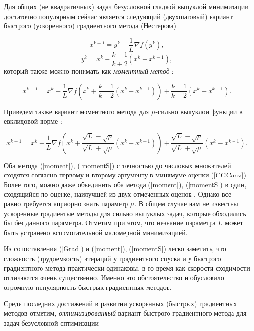   Для общих (не квадратичных) задач безусловной гладкой выпуклой минимизации достаточно популярным сейчас является следующий (двухшаговый) вариант быстрого (ускоренного) градиентного метода (Нестерова) 

  \[
    x^{k+1}=y^k-\frac{1}{L}\nabla f\left( {y^k} \right),
  \]
  \[
    y^k=x^k+\frac{k-1}{k+2}\left( {x^k-x^{k-1}} \right),
  \]
  который также можно понимать как \textit{моментный метод} \cite{su2014differential}:

  \begin{equation}
  \label{moment}
    x^{k+1}=x^k-\frac{1}{L}\nabla f\left( {x^k+\frac{k-1}{k+2}\left( {x^k-x^{k-1}} \right)} \right)+\frac{k-1}{k+2}\left( {x^k-x^{k-1}} \right).
  \end{equation}

  Приведем также вариант моментного метода для $\mu $-сильно выпуклой функции в евклидовой норме \cite{nesterov2013introductory}:

  \begin{equation}
  \label{momentS}
    x^{k+1}=x^k-\frac{1}{L}\nabla f\left( {x^k+\frac{\sqrt L -\sqrt \mu }{\sqrt L +\sqrt \mu }\left( {x^k-x^{k-1}} \right)} \right)+\frac{\sqrt L -\sqrt \mu }{\sqrt L +\sqrt \mu }\left( {x^k-x^{k-1}} \right).
  \end{equation}

  Оба метода (\ref{moment}), (\ref{momentS}) с точностью до числовых множителей сходятся согласно первому и второму аргументу в минимуме оценки (\ref{CGConv}). Более того, можно даже объединить оба метода (\ref{moment}), (\ref{momentS}) в один, сходящийся по оценке, наилучшей из двух отмеченных оценок \cite{nesterov2013introductory}. Однако все равно требуется априорно знать параметр $\mu$. В общем случае нам не известны ускоренные градиентые методы для сильно выпуклых задач, которые обходились бы без данного параметра. Отметим при этом, что незнание параметра $L$ может быть устранено вспомогательной маломерной минимизацией.

  \iffalse
    Из сопоставления (\ref{Grad}) и (\ref{moment}), (\ref{momentS}) легко заметить, что сложность (трудоемкость) итераций у градиентного спуска и у быстрого градиентного метода практически одинаковы, в то время как скорости сходимости отличаются очень существенно. Именно это обстоятельство и обусловило огромную популярность быстрых градиентных методов. 

    Среди последних достижений в развитии ускоренных (быстрых) градиентных методов отметим, \textit{оптимизированный} вариант быстрого градиентного метода для задач безусловной оптимизации \cite{drori2018efficient}

